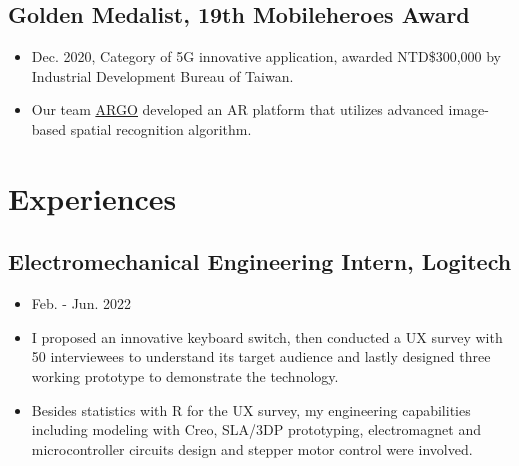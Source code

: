 \documentclass[12pt]{article}
\begin{document}
        \subsection*{Golden Medalist, 19th Mobileheroes Award}
        {\sffamily
        \begin{itemize}
            \item Dec. 2020, Category of 5G innovative application, awarded NTD\$300,000 by Industrial Development Bureau of Taiwan.
            \item Our team \href{https://bencer3283.github.io/experiences/5G/}{\underline{ARGO}} developed an AR platform that utilizes advanced image-based spatial recognition algorithm.   
        \end{itemize}
        }
    \section*{Experiences
    }
        \subsection*{Electromechanical Engineering Intern, Logitech}
        {\sffamily
        \begin{itemize}
            \item Feb. - Jun. 2022
            \item I proposed an innovative keyboard switch, then conducted a UX survey with 50 interviewees to understand its target audience and lastly designed three working prototype to demonstrate the technology.
            \item Besides statistics with R for the UX survey, my engineering capabilities including modeling with Creo, SLA/3DP prototyping, electromagnet and microcontroller circuits design and stepper motor control were involved.
        \end{itemize}
        }
\end{document}
